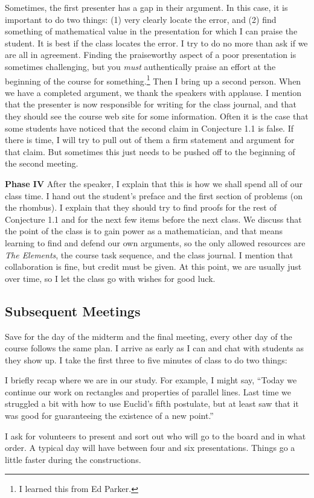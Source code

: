 \documentclass{tufte-handout}
\theoremstyle{definition}
\begin{document}
\begin{compactdesc}
Sometimes, the first presenter has a gap in their argument. 
In this case, it is important to do two things: (1) very clearly locate the error, and (2) find something of mathematical value in the presentation for which I can praise the student.
It is best if the class locates the error.
I try to do no more than ask if we are all in agreement.
Finding the praiseworthy aspect of a poor presentation is sometimes challenging, but you \emph{must} authentically praise an effort at the beginning of the course for something.\footnote{I learned this from Ed Parker.}
Then I bring up a second person.
When we have a completed argument, we thank the speakers with applause. I mention that the presenter is now responsible for writing for the class journal, and that they should see the course web site for some information.
Often it is the case that some students have noticed that the second claim in Conjecture 1.1 is false. If there is time, I will try to pull out of them a firm statement and argument for that claim. But sometimes this just needs to be pushed off to the beginning of the second meeting.
\\[.1in]

\item[\textbf{Phase IV}] After the speaker, I explain that this is how we shall spend all of our class time.
I hand out the student's preface and the first section of problems (on the rhombus).
I explain that they should try to find proofs for the rest of Conjecture 1.1 and for the next few items before the next class.
We discuss that the point of the class is to gain power as a mathematician, and that means learning to find and defend our own arguments, so the only allowed resources are \emph{The Elements}, the course task sequence, and the class journal.
I mention that collaboration is fine, but credit must be given.
At this point, we are usually just over time, so I let the class go with wishes for good luck.\\[.1in]
\end{compactdesc}

\subsection{Subsequent Meetings}

Save for the day of the midterm and the final meeting, every other day of the course follows the same plan. I arrive as early as I can and chat with students as they show up. I take the first three to five minutes of class to do two things: 
\begin{compactenum}
\item  I briefly recap where we are in our study. For example, I might say, ``Today we continue our work on rectangles and properties of parallel lines. Last time we struggled a bit with how to use Euclid's fifth postulate, but at least saw that it was good for guaranteeing the existence of a new point.''
\item I ask for volunteers to present and sort out who will 
go to the board and in what order. A typical day will have between four and six presentations. Things go a little faster during the constructions.
\end{compactenum}
\end{document}

